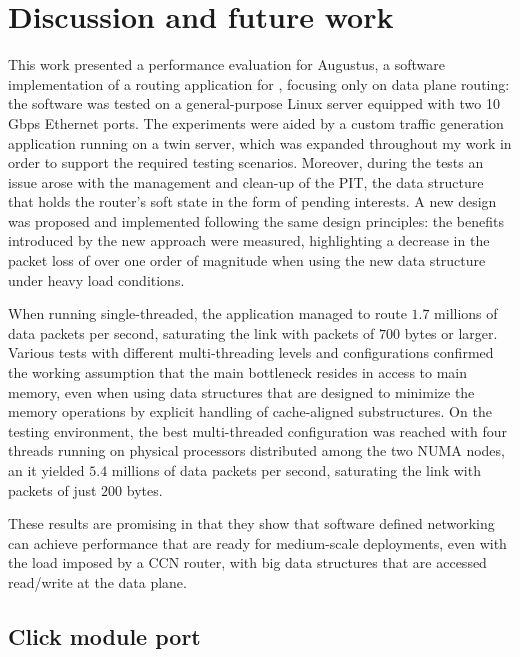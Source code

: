 \documentclass[11pt,a4paper,twoside,titlepage,openany]{book}
\begin{document}
\chapter{Discussion and future work}
\label{chap:conclusions}

This work presented a performance evaluation for Augustus, a software implementation of a routing application for , focusing only on data plane routing: the software was tested on a general-purpose Linux server equipped with two 10 Gbps Ethernet ports.
The experiments were aided by a custom traffic generation application running on a twin server, which was expanded throughout my work in order to support the required testing scenarios. 
Moreover, during the tests an issue arose with the management and clean-up of the PIT, the data structure that holds the router's soft state in the form of pending interests. A new design was proposed and implemented following the same design principles: the benefits introduced by the new approach were measured, highlighting a decrease in the packet loss of over one order of magnitude when using the new data structure under heavy load conditions.

When running single-threaded, the application managed to route $1.7$ millions of data packets per second, saturating the link with packets of $700$ bytes or larger. Various tests with different multi-threading levels and configurations confirmed the working assumption that the main bottleneck resides in access to main memory, even when using data structures that are designed to minimize the  memory operations by explicit handling of cache-aligned substructures. On the testing environment, the best multi-threaded configuration was reached with four threads running on physical processors distributed among the two \gls{NUMA} nodes, an it yielded $5.4$ millions of data packets per second, saturating the link with packets of just $200$ bytes.

These results are promising in that they show that software defined networking can achieve performance that are ready for medium-scale deployments, even with the load imposed by a \gls{CCN} router, with big data structures that are accessed read/write at the data plane.

\section{Click module port}\label{sec:augustus.click}

\end{document}
